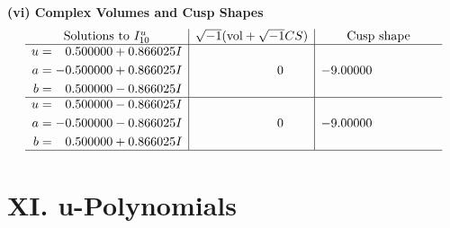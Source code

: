 \documentclass[1p]{elsarticle_modified}
\theoremstyle{definition}
\newcommand{\I}{\sqrt{-1}}
\begin{document}
\newpage\flushleft \textbf{(vi) Complex Volumes and Cusp Shapes}
$$\begin{array}{c|c|c}  
\text{Solutions to }I^u_{10}& \I (\text{vol} + \sqrt{-1}CS) & \text{Cusp shape}\\
 \hline 
\begin{aligned}
u &= \phantom{-}0.500000 + 0.866025 I \\
a &= -0.500000 + 0.866025 I \\
b &= \phantom{-}0.500000 - 0.866025 I\end{aligned}
 & \phantom{-0.000000 } 0 & -9.00000\phantom{ +0.000000I} \\ \hline\begin{aligned}
u &= \phantom{-}0.500000 - 0.866025 I \\
a &= -0.500000 - 0.866025 I \\
b &= \phantom{-}0.500000 + 0.866025 I\end{aligned}
 & \phantom{-0.000000 } 0 & -9.00000\phantom{ +0.000000I}\\
 \hline 
 \end{array}$$\newpage
\newpage\renewcommand{\arraystretch}{1}
\centering \section*{ XI. u-Polynomials}
\end{document}
